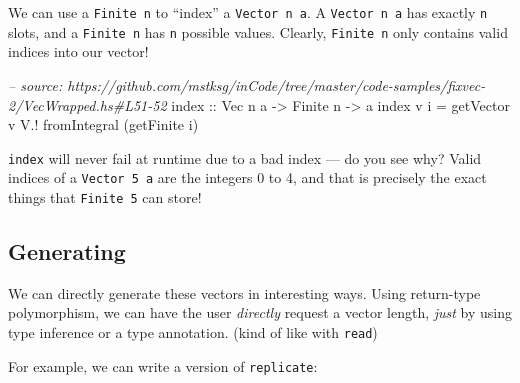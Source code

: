 \documentclass[]{article}
\newenvironment{Shaded}{}{}
\newcommand{\KeywordTok}[1]{\textcolor[rgb]{0.00,0.44,0.13}{\textbf{#1}}}
\newcommand{\DataTypeTok}[1]{\textcolor[rgb]{0.56,0.13,0.00}{#1}}
\newcommand{\CommentTok}[1]{\textcolor[rgb]{0.38,0.63,0.69}{\textit{#1}}}
\newcommand{\OtherTok}[1]{\textcolor[rgb]{0.00,0.44,0.13}{#1}}
\newcommand{\FunctionTok}[1]{\textcolor[rgb]{0.02,0.16,0.49}{#1}}
\newcommand{\NormalTok}[1]{#1}
\begin{document}
We can use a \texttt{Finite\ n} to ``index'' a \texttt{Vector\ n\ a}. A
\texttt{Vector\ n\ a} has exactly \texttt{n} slots, and a \texttt{Finite\ n} has
\texttt{n} possible values. Clearly, \texttt{Finite\ n} only contains valid
indices into our vector!

\begin{Shaded}
\begin{Highlighting}[]
\CommentTok{-- source: https://github.com/mstksg/inCode/tree/master/code-samples/fixvec-2/VecWrapped.hs#L51-52}
\NormalTok{index}\OtherTok{ ::} \DataTypeTok{Vec}\NormalTok{ n a }\OtherTok{->} \DataTypeTok{Finite}\NormalTok{ n }\OtherTok{->}\NormalTok{ a}
\NormalTok{index v i }\FunctionTok{=}\NormalTok{ getVector v }\FunctionTok{V.!}\NormalTok{ fromIntegral (getFinite i)}
\end{Highlighting}
\end{Shaded}

\texttt{index} will never fail at runtime due to a bad index --- do you see why?
Valid indices of a \texttt{Vector\ 5\ a} are the integers 0 to 4, and that is
precisely the exact things that \texttt{Finite\ 5} can store!

\subsection{Generating}\label{generating}

We can directly generate these vectors in interesting ways. Using return-type
polymorphism, we can have the user \emph{directly} request a vector length,
\emph{just} by using type inference or a type annotation. (kind of like with
\texttt{read})

For example, we can write a version of \texttt{replicate}:

\begin{Shaded}
\end{Shaded}
\end{document}
